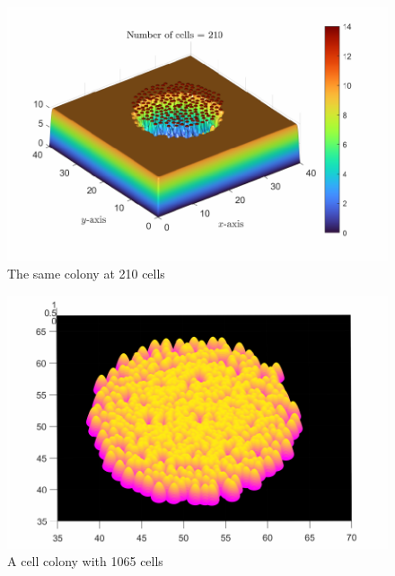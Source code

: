\begin{figure}[h]
\centering
\includegraphics[width=1\textwidth]{chapter1/figures/ColonySimulationDemoNutrientField_N_210.pdf}
\caption{The same colony at 210 cells}
\label{fig:ColonySimulationNutrientFieldN210}
\end{figure}
\filbreak

\begin{figure}[!htb] %
\centering
\includegraphics[width=1\textwidth]{chapter1/figures/ColonySimulationDemoNutrientField_N_1065.pdf}
\caption{A cell colony with 1065 cells }
\label{fig:ColonySimulationNutrientFieldN210}
\end{figure}
\filbreak

